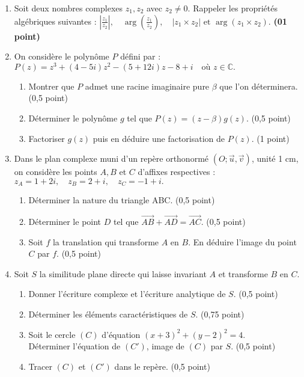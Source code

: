 \documentclass[11pt]{article}
\begin{document}
\begin{enumerate}[label=\Alph*.]
\item Soit deux nombres complexes \( z_1, z_2 \) avec \( z_2 \ne 0 \). Rappeler les propriétés algébriques suivantes : 
\(
\left| \frac{z_1}{z_2} \right|, \quad \arg\left(\frac{z_1}{z_2}\right), \quad |z_1 \times z_2| \text{ et } \arg(z_1 \times z_2).
\)
\hfill \textbf{(01 point)}

\item On considère le polynôme \( P \) défini par :
\(
P(z) = z^3 + (4 - 5i)z^2 - (5 + 12i)z - 8 + i \quad \text{où } z \in \mathbb{C}.
\)
\begin{enumerate}
    \item Montrer que \( P \) admet une racine imaginaire pure \( \beta \) que l’on déterminera. \hfill (0,5 point)
    \item Déterminer le polynôme \( g \) tel que \( P(z) = (z - \beta)g(z) \). \hfill (0,5 point)
    \item Factoriser \( g(z) \) puis en déduire une factorisation de \( P(z) \). \hfill (1 point)
\end{enumerate}

\item Dans le plan complexe muni d’un repère orthonormé \((O; \vec{u}, \vec{v})\), unité 1 cm, on considère les points \( A, B \) et \( C \) d’affixes respectives :
\(
z_A = 1 + 2i,\quad z_B = 2 + i,\quad z_C = -1 + i.
\)
\begin{enumerate}
    \item Déterminer la nature du triangle ABC. \hfill (0,5 point)
    \item Déterminer le point \( D \) tel que \( \overrightarrow{AB} + \overrightarrow{AD} = \overrightarrow{AC} \). \hfill (0,5 point)
    \item Soit \( f \) la translation qui transforme \( A \) en \( B \). En déduire l’image du point \( C \) par \( f \). \hfill (0,5 point)
\end{enumerate}

\item Soit \( S \) la similitude plane directe qui laisse invariant \( A \) et transforme \( B \) en \( C \).
\begin{enumerate}
    \item Donner l’écriture complexe et l’écriture analytique de \( S \). \hfill (0,5 point)
    \item Déterminer les éléments caractéristiques de \( S \). \hfill (0,75 point)
    \item Soit le cercle \( (C) \) d’équation \( (x + 3)^2 + (y - 2)^2 = 4 \). \\
    Déterminer l’équation de \( (C') \), image de \( (C) \) par \( S \). \hfill (0,5 point)
    \item Tracer \( (C) \) et \( (C') \) dans le repère. \hfill (0,5 point)
\end{enumerate}
\end{enumerate}
\end{document}
